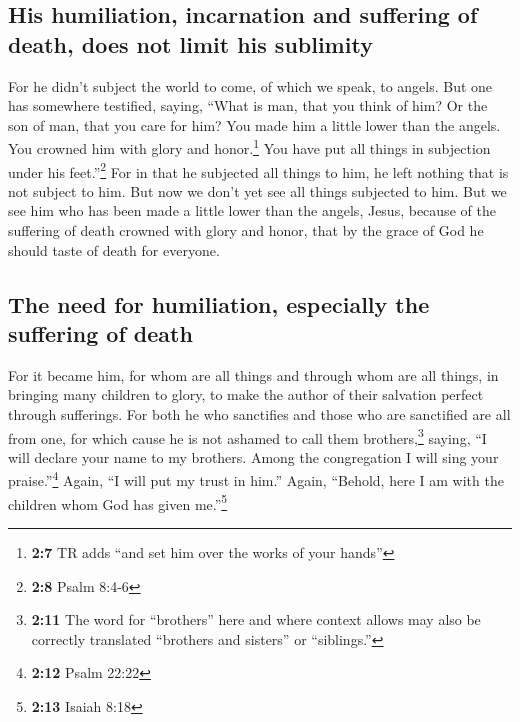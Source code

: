 \hypertarget{his-humiliation-incarnation-and-suffering-of-death-does-not-limit-his-sublimity}{%
\subsection{His humiliation, incarnation and suffering of death, does
not limit his
sublimity}\label{his-humiliation-incarnation-and-suffering-of-death-does-not-limit-his-sublimity}}

 For he didn't subject the world to come, of which we
speak, to angels.  But one has somewhere testified,
saying, ``What is man, that you think of him? Or the son of man, that
you care for him?  You made him a little lower than the
angels. You crowned him with glory and honor.\footnote{\textbf{2:7} TR
  adds ``and set him over the works of your hands''}  You
have put all things in subjection under his feet.''\footnote{\textbf{2:8}
  Psalm 8:4-6} For in that he subjected all things to him, he left
nothing that is not subject to him. But now we don't yet see all things
subjected to him.  But we see him who has been made a
little lower than the angels, Jesus, because of the suffering of death
crowned with glory and honor, that by the grace of God he should taste
of death for everyone.

\hypertarget{the-need-for-humiliation-especially-the-suffering-of-death}{%
\subsection{The need for humiliation, especially the suffering of
death}\label{the-need-for-humiliation-especially-the-suffering-of-death}}

 For it became him, for whom are all things and through
whom are all things, in bringing many children to glory, to make the
author of their salvation perfect through sufferings. 
For both he who sanctifies and those who are sanctified are all from
one, for which cause he is not ashamed to call them brothers,\footnote{\textbf{2:11}
  The word for ``brothers'' here and where context allows may also be
  correctly translated ``brothers and sisters'' or ``siblings.''}
 saying, ``I will declare your name to my brothers. Among
the congregation I will sing your praise.''\footnote{\textbf{2:12} Psalm
  22:22}  Again, ``I will put my trust in him.'' Again,
``Behold, here I am with the children whom God has given
me.''\footnote{\textbf{2:13} Isaiah 8:18}

